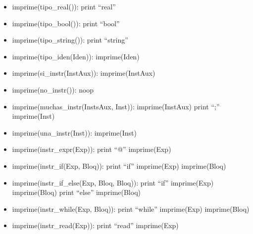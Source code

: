 \documentclass[11pt]{article}
\begin{document}
\begin{itemize}
            \item imprime(tipo\_real()):
                \subitem print “real”
            
            \item imprime(tipo\_bool()):
                \subitem print “bool”
            
            \item imprime(tipo\_string()):
                \subitem print “string”
            
            \item imprime(tipo\_iden(Iden)):
                \subitem imprime(Iden)
            
            \item imprime(si\_instr(InstAux)):
                \subitem imprime(InstAux)
            
            \item imprime(no\_instr()): noop
            
            \item imprime(muchas\_instr(InstsAux, Inst)):
                \subitem imprime(InstAux)
                \subitem print “;”
                \subitem imprime(Inst)
            
            \item imprime(una\_instr(Inst)):
                \subitem imprime(Inst)
            
            \item imprime(instr\_expr(Exp)):
                \subitem print “@”
                \subitem imprime(Exp)
            
            \item imprime(instr\_if(Exp, Bloq)):
                \subitem print “if”
                \subitem imprime(Exp)
                \subitem imprime(Bloq)
            
            \item imprime(instr\_if\_else(Exp, Bloq, Bloq)):
                \subitem print “if”
                \subitem imprime(Exp)
                \subitem imprime(Bloq)
                \subitem print “else”
                \subitem imprime(Bloq)
            
            \item imprime(instr\_while(Exp, Bloq)):
                \subitem print “while”
                \subitem imprime(Exp)
                \subitem imprime(Bloq)
            
            \item imprime(instr\_read(Exp)):
                \subitem print “read”
                \subitem imprime(Exp)
            

\end{itemize}
\end{document}
